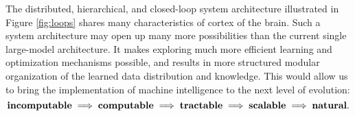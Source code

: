 \documentclass[../../book-main.tex]{subfiles}
\begin{document}
The distributed, hierarchical, and closed-loop system architecture illustrated in Figure \ref{fig:loops} shares many characteristics of cortex of the brain. Such a system architecture may open up many more possibilities than the current single large-model architecture. It makes exploring much more efficient learning and optimization mechanisms possible, and results in more structured modular organization of the learned data distribution and knowledge. This would allow us to bring the implementation of machine intelligence to the next level of evolution: 
\begin{equation}
   \mbox{\textbf{incomputable}} \;
   \Longrightarrow \; \mbox{\textbf{computable}} \;
   \Longrightarrow \; \mbox{\textbf{tractable}} \; \Longrightarrow \; 
   \mbox{\textbf{scalable}} \; \Longrightarrow \; 
   \mbox{\textbf{natural}}.
\end{equation}
\end{document}
